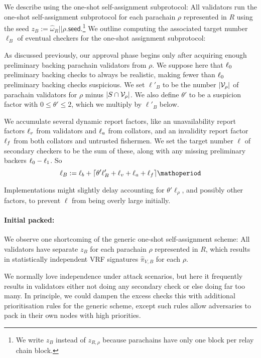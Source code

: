 \begin{enumerate}
\begin{enumerate}
We describe using the one-shot self-assignment subprotocol:  All validators run the one-shot self-assignment subprotocol for each parachain $\rho$ represented in $R$ using the seed $z_B := \hat{\omega}_R || \rho.\mathsf{seed}$.\footnote{We write $z_B$ instead of $z_{R,\rho}$ because parachains have only one block per relay chain block.}  We outline computing the associated target number $\ell_B$ of eventual checkers for the one-shot assignment subprotocol: 

As discussed previously, our approval phase begins only after acquiring enough preliminary backing parachain validators from $\rho$.  We suppose here that $\ell_0$ preliminary backing checks to always be realistic, making fewer than $\ell_0$ preliminary backing checks suspicious.  We set $\ell'_B$ to be the number $|\mathcal{V}_\rho|$ of parachain validators for $\rho$ minus $|S \cap \mathcal{V}_\rho|$. 
We also define $\theta'$ to be a suspicion factor with $0 \le \theta' \le 2$, which we multiply by $\ell'_B$ below.

We accumulate several dynamic report factors, like an unavailability report factors $\ell_v$ from validators and $\ell_a$ from collators, and an invalidity report factor $\ell_f$ from both collators and untrusted fishermen.  We set the target number $\ell$ of secondary checkers to be the sum of these, along with any missing preliminary backers $\ell_0-\ell_1$.  So
$$ \ell_B := \basesecondarychecks + \lceil \theta' \ell'_B + \rfuv + \runav + \rinv \rceil \mathoperiod $$

Implementations might slightly delay accounting for $\theta' \ell_\rho$, and possibly other factors, to prevent $\ell$ from being overly large initially. 

\smallskip
\paragraph{Initial packed:}

We observe one shortcoming of the generic one-shot self-assignment scheme:  All validators have separate $z_B$ for each parachain $\rho$ represented in $R$, which results in statistically independent VRF signatures $\hat{\pi}_{V,B}$ for each $\rho$.  

We normally love independence under attack scenarios, but here it frequently results in validators either not doing any secondary check or else doing far too many.  In principle, we could dampen the excess checks this with additional prioritisation rules for the generic scheme, except such rules allow adversaries to pack in their own nodes with high priorities.


\end{enumerate}
\end{enumerate}
